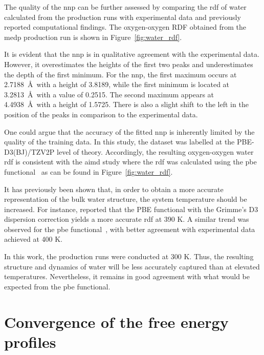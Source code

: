 The quality of the \ac{nnp} can be further assessed by comparing the \ac{rdf} of water calculated from the production runs with experimental data and previously reported computational findings. The oxygen-oxygen RDF obtained from the \ac{medp} production run is shown in Figure~\ref{fig:water_rdf}.

It is evident that the \ac{nnp} is in qualitative agreement with the experimental data. However, it overestimates the heights of the first two peaks and underestimates the depth of the first minimum. For the \ac{nnp}, the first maximum occurs at 2.7188~\AA\ with a height of 3.8189, while the first minimum is located at 3.2813~\AA\ with a value of 0.2515. The second maximum appears at 4.4938~\AA\ with a height of 1.5725. There is also a slight shift to the left in the position of the peaks in comparison to the experimental data.

One could argue that the accuracy of the fitted \ac{nnp} is inherently limited by the quality of the training data. In this study, the dataset was labelled at the PBE-D3(BJ)/TZV2P level of theory. Accordingly, the resulting oxygen-oxygen water \ac{rdf} is consistent with the \ac{aimd} study where the \ac{rdf} was calculated using the \ac{pbe} functional~\citep{phamStructureDynamicsAqueous2016} as can be found in Figure~\ref{fig:water_rdf}.

It has previously been shown that, in order to obtain a more accurate representation of the bulk water structure, the system temperature should be increased. For instance, \citep{zhouQuantifyingStructureWater2022} reported that the PBE functional with the Grimme's D3 dispersion correction yields a more accurate \ac{rdf} at 390 K. A similar trend was observed for the \ac{pbe} functional~\citep{phamStructureDynamicsAqueous2016}, with better agreement with experimental data achieved at 400 K.

In this work, the production runs were conducted at 300 K. Thus, the resulting structure and dynamics of water will be less accurately captured than at elevated temperatures. Nevertheless, it remains in good agreement with what would be expected from the \ac{pbe} functional.



\section{Convergence of the free energy profiles}

